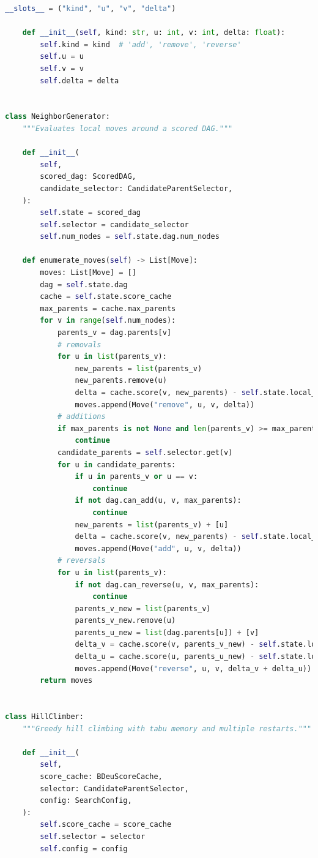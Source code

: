 \documentclass[twoside,11pt]{article}
\begin{document}
\begin{algorithm}
\begin{lstlisting}[language=Python]
    __slots__ = ("kind", "u", "v", "delta")

    def __init__(self, kind: str, u: int, v: int, delta: float):
        self.kind = kind  # 'add', 'remove', 'reverse'
        self.u = u
        self.v = v
        self.delta = delta


class NeighborGenerator:
    """Evaluates local moves around a scored DAG."""

    def __init__(
        self,
        scored_dag: ScoredDAG,
        candidate_selector: CandidateParentSelector,
    ):
        self.state = scored_dag
        self.selector = candidate_selector
        self.num_nodes = self.state.dag.num_nodes

    def enumerate_moves(self) -> List[Move]:
        moves: List[Move] = []
        dag = self.state.dag
        cache = self.state.score_cache
        max_parents = cache.max_parents
        for v in range(self.num_nodes):
            parents_v = dag.parents[v]
            # removals
            for u in list(parents_v):
                new_parents = list(parents_v)
                new_parents.remove(u)
                delta = cache.score(v, new_parents) - self.state.local_scores[v]
                moves.append(Move("remove", u, v, delta))
            # additions
            if max_parents is not None and len(parents_v) >= max_parents:
                continue
            candidate_parents = self.selector.get(v)
            for u in candidate_parents:
                if u in parents_v or u == v:
                    continue
                if not dag.can_add(u, v, max_parents):
                    continue
                new_parents = list(parents_v) + [u]
                delta = cache.score(v, new_parents) - self.state.local_scores[v]
                moves.append(Move("add", u, v, delta))
            # reversals
            for u in list(parents_v):
                if not dag.can_reverse(u, v, max_parents):
                    continue
                parents_v_new = list(parents_v)
                parents_v_new.remove(u)
                parents_u_new = list(dag.parents[u]) + [v]
                delta_v = cache.score(v, parents_v_new) - self.state.local_scores[v]
                delta_u = cache.score(u, parents_u_new) - self.state.local_scores[u]
                moves.append(Move("reverse", u, v, delta_v + delta_u))
        return moves


class HillClimber:
    """Greedy hill climbing with tabu memory and multiple restarts."""

    def __init__(
        self,
        score_cache: BDeuScoreCache,
        selector: CandidateParentSelector,
        config: SearchConfig,
    ):
        self.score_cache = score_cache
        self.selector = selector
        self.config = config


\end{lstlisting}
\end{algorithm}
\end{document}

